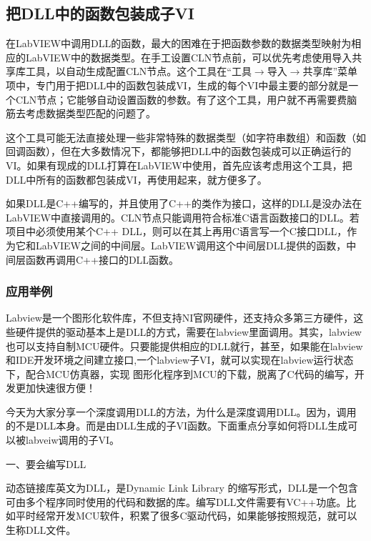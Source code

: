 


\subsection{把DLL中的函数包装成子VI}
在LabVIEW中调用DLL的函数，最大的困难在于把函数参数的数据类型映射为相应的LabVIEW中的数据类型。在手工设置CLN节点前，可以优先考虑使用导入共享库工具，以自动生成配置CLN节点。这个工具在“工具$\rightarrow$导入$\rightarrow$共享库”菜单项中，专门用于把DLL中的函数包装成VI，生成的每个VI中最主要的部分就是一个CLN节点；它能够自动设置函数的参数。有了这个工具，用户就不再需要费脑筋去考虑数据类型匹配的问题了。

这个工具可能无法直接处理一些非常特殊的数据类型（如字符串数组）和函数（如回调函数），但在大多数情况下，都能够把DLL中的函数包装成可以正确运行的VI。如果有现成的DLL打算在LabVIEW中使用，首先应该考虑用这个工具，把DLL中所有的函数都包装成VI，再使用起来，就方便多了。

如果DLL是C++编写的，并且使用了C++的类作为接口，这样的DLL是没办法在LabVIEW中直接调用的。CLN节点只能调用符合标准C语言函数接口的DLL。若项目中必须使用某个C++ DLL，则可以在其上再用C语言写一个C接口DLL，作为它和LabVIEW之间的中间层。LabVIEW调用这个中间层DLL提供的函数，中间层函数再调用C++接口的DLL函数。



\subsubsection{应用举例}
Labview是一个图形化软件库，不但支持NI官网硬件，还支持众多第三方硬件，这些硬件提供的驱动基本上是DLL的方式，需要在labview里面调用。其实，labview也可以支持自制MCU硬件。只要能提供相应的DLL就行，甚至，如果能在labview和IDE开发环境之间建立接口,一个labview子VI，就可以实现在labview运行状态下，配合MCU仿真器，实现  图形化程序到MCU的下载，脱离了C代码的编写，开发更加快速很方便！

     今天为大家分享一个深度调用DLL的方法，为什么是深度调用DLL。因为，调用的不是DLL本身。而是由DLL生成的子VI函数。下面重点分享如何将DLL生成可以被labveiw调用的子VI。


一、要会编写DLL

     动态链接库英文为DLL，是Dynamic Link Library 的缩写形式，DLL是一个包含可由多个程序同时使用的代码和数据的库。编写DLL文件需要有VC++功底。比如平时经常开发MCU软件，积累了很多C驱动代码，如果能够按照规范，就可以生称DLL文件。
     
